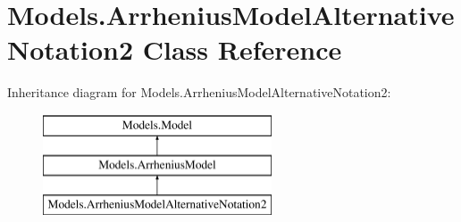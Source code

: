 \hypertarget{classModels_1_1ArrheniusModelAlternativeNotation2}{\section{\-Models.\-Arrhenius\-Model\-Alternative\-Notation2 \-Class \-Reference}
\label{classModels_1_1ArrheniusModelAlternativeNotation2}
}
\-Inheritance diagram for \-Models.\-Arrhenius\-Model\-Alternative\-Notation2\-:\begin{figure}[H]
\begin{center}
\leavevmode
\includegraphics[height=3.000000cm]{classModels_1_1ArrheniusModelAlternativeNotation2}
\end{center}
\end{figure}

